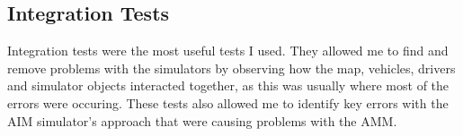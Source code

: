 \subsection{Integration Tests}
\label{subsec:Integration Tests}
Integration tests were the most useful tests I used. They allowed me to find and remove problems with the simulators by observing how the map, vehicles, drivers and simulator objects interacted together, as this was usually where most of the errors were occuring. These tests also allowed me to identify key errors with the AIM simulator's approach that were causing problems with the AMM.
